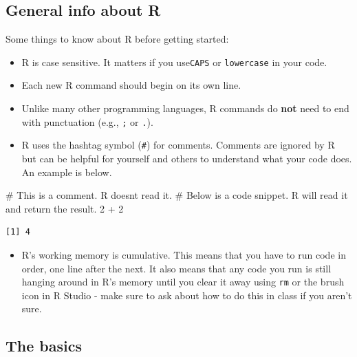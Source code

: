 \documentclass[
  letterpaper,
  DIV=11,
  numbers=noendperiod]{scrreprt}
\newenvironment{Shaded}{\begin{snugshade}}{\end{snugshade}}
\newcommand{\CommentTok}[1]{\textcolor[rgb]{0.37,0.37,0.37}{#1}}
\newcommand{\DecValTok}[1]{\textcolor[rgb]{0.68,0.00,0.00}{#1}}
\newcommand{\SpecialCharTok}[1]{\textcolor[rgb]{0.37,0.37,0.37}{#1}}
\providecommand{\tightlist}{%
  \setlength{\itemsep}{0pt}\setlength{\parskip}{0pt}}\usepackage{longtable,booktabs,array}
\begin{document}
\hypertarget{general-info-about-r}{%
\subsection{General info about R}\label{general-info-about-r}}

Some things to know about R before getting started:

\begin{itemize}
\item
  R is case sensitive. It matters if you use\texttt{CAPS} or
  \texttt{lowercase} in your code.
\item
  Each new R command should begin on its own line.
\item
  Unlike many other programming languages, R commands do \textbf{not}
  need to end with punctuation (e.g., \texttt{;} or \texttt{.}).
\item
  R uses the hashtag symbol (\texttt{\#}) for comments. Comments are
  ignored by R but can be helpful for yourself and others to understand
  what your code does. An example is below.
\end{itemize}

\begin{Shaded}
\begin{Highlighting}[]
\CommentTok{\# This is a comment. R doesn\textquotesingle{}t read it.}
\CommentTok{\# Below is a code snippet. R will read it and return the result. }
\DecValTok{2} \SpecialCharTok{+} \DecValTok{2}
\end{Highlighting}
\end{Shaded}

\begin{verbatim}
[1] 4
\end{verbatim}

\begin{itemize}
\tightlist
\item
  R's working memory is cumulative. This means that you have to run code
  in order, one line after the next. It also means that any code you run
  is still hanging around in R's memory until you clear it away using
  \texttt{rm} or the brush icon in R Studio - make sure to ask about how
  to do this in class if you aren't sure.
\end{itemize}

\hypertarget{the-basics}{%
\subsection{The basics}\label{the-basics}}
\end{document}
